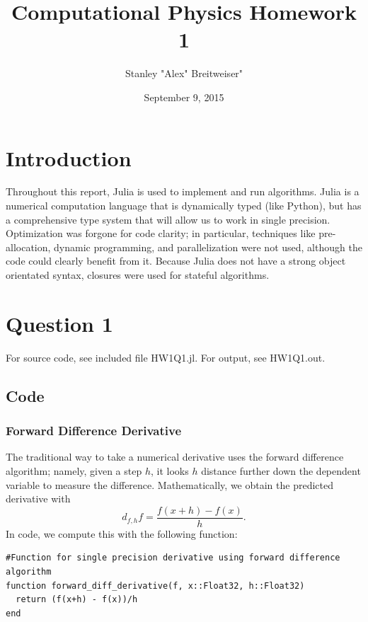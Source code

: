 \documentclass{article}
\title{Computational Physics Homework 1}
\date{September 9, 2015}
\author{Stanley "Alex" Breitweiser"}
\begin{document}
\maketitle
\section*{Introduction}
Throughout this report, Julia is used to implement and run algorithms. Julia is a numerical computation language that is dynamically typed (like Python), but has a comprehensive type system that will allow us to work in single precision. Optimization was forgone for code clarity; in particular, techniques like pre-allocation, dynamic programming, and parallelization were not used, although the code could clearly benefit from it. Because Julia does not have a strong object orientated syntax, closures were used for stateful algorithms.

\section{Question 1}
For source code, see included file HW1Q1.jl. For output, see HW1Q1.out.

\subsection{Code}
\subsubsection{Forward Difference Derivative}
The traditional way to take a numerical derivative uses the forward difference algorithm; namely, given a step $h$, it looks $h$ distance further down the dependent variable to measure the difference. Mathematically, we obtain the predicted derivative with
$$d_{f,h}f = \frac{f(x+h) - f(x)}{h}.$$
In code, we compute this with the following function:
\begin{lstlisting}
#Function for single precision derivative using forward difference algorithm
function forward_diff_derivative(f, x::Float32, h::Float32)
  return (f(x+h) - f(x))/h
end
\end{lstlisting}
\end{document}
